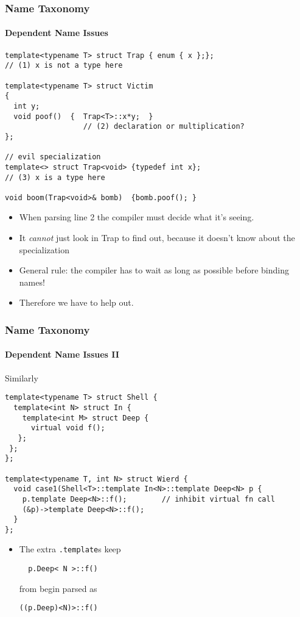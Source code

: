 \begin{frame}[fragile,t]
\frametitle{Name Taxonomy}
\framesubtitle{Dependent Name Issues}
{\scriptsize
\begin{verbatim}
template<typename T> struct Trap { enum { x };};
// (1) x is not a type here

template<typename T> struct Victim
{
  int y;
  void poof()  {  Trap<T>::x*y;  }  
                  // (2) declaration or multiplication?
};

// evil specialization
template<> struct Trap<void> {typedef int x};
// (3) x is a type here

void boom(Trap<void>& bomb)  {bomb.poof(); }
\end{verbatim}
}


\begin{itemize}[<+->]
\item When parsing line 2 the compiler must decide what it's seeing.
\item It \emph{cannot} just look in Trap to find out, because it
  doesn't know about the specialization
\item General rule: the compiler has to wait as long as possible
  before binding names!
\item Therefore we have to help out.
\end{itemize}
\end{frame}

\begin{frame}[fragile,t]
\frametitle{Name Taxonomy}
\framesubtitle{Dependent Name Issues II}
Similarly
{\scriptsize
\begin{verbatim}
template<typename T> struct Shell {
  template<int N> struct In {
    template<int M> struct Deep {
      virtual void f();
   };
 };
};

template<typename T, int N> struct Wierd {
  void case1(Shell<T>::template In<N>::template Deep<N> p {
    p.template Deep<N>::f();        // inhibit virtual fn call
    (&p)->template Deep<N>::f();
  }
};
\end{verbatim}
}

\begin{itemize}[<+->]

\item The extra \texttt{.template}s keep 
{\scriptsize
\begin{verbatim}
  p.Deep< N >::f()
\end{verbatim}
}
from begin parsed as
{\scriptsize
\begin{verbatim}
((p.Deep)<N)>::f()
\end{verbatim}
}

\end{itemize}

\end{frame}


